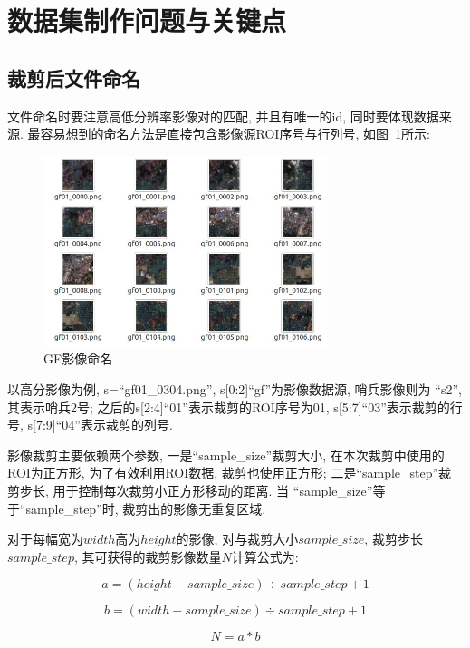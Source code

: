 \section{数据集制作问题与关键点}

\subsection{裁剪后文件命名}
文件命名时要注意高低分辨率影像对的匹配, 并且有唯一的id, 同时要体现数据来源. 最容易想到的命名方法是直接包含影像源ROI序号与行列号, 如图~\ref{fig:0201}所示:

\begin{figure}[!htbp]
    \centering
    \includegraphics[height=15em]{pic/q0101.jpg}
    \caption{GF影像命名}
    \label{fig:0201}
\end{figure}

以高分影像为例, s=``gf01\_0304.png'', s[0:2]``gf''为影像数据源, 哨兵影像则为 ``s2'', 其表示哨兵2号; 之后的s[2:4]``01''表示裁剪的ROI序号为01, s[5:7]``03''表示裁剪的行号, s[7:9]``04''表示裁剪的列号.

影像裁剪主要依赖两个参数, 一是``sample\_size''裁剪大小, 在本次裁剪中使用的ROI为正方形, 为了有效利用ROI数据, 裁剪也使用正方形; 二是``sample\_step''裁剪步长, 用于控制每次裁剪小正方形移动的距离. 当 ``sample\_size''等于``sample\_step''时, 裁剪出的影像无重复区域.

对于每幅宽为$width$高为$height$的影像, 对与裁剪大小$sample\_size$, 裁剪步长$sample\_step$, 其可获得的裁剪影像数量$N$计算公式为:

\begin{equation}
    a = (height - sample\_size)\div sample\_step + 1 
\end{equation}

\begin{equation}
    b = (width - sample\_size)\div sample\_step + 1 
\end{equation}

\begin{equation}
    N = a * b
\end{equation}

